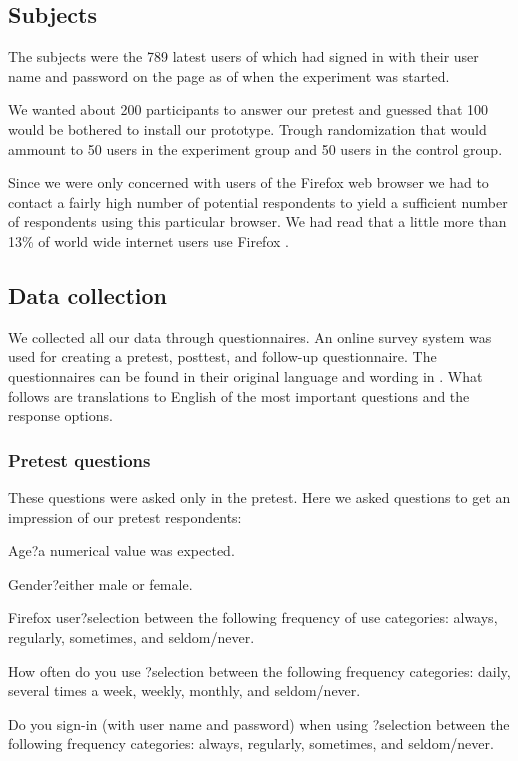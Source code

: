 \subsection{Subjects}

The subjects were the 789 latest users of \urort{} which had
signed in with their user name and password on the \urort{} page as of when
the experiment was started.

We wanted about 200 participants to answer our pretest and guessed that
100 would be bothered to install our prototype. Trough randomization
that would ammount to 50 users in the experiment group and 50 users
in the control group.

Since we were only concerned with users of the Firefox web browser we had to
contact a fairly high number of potential respondents to yield a sufficient
number of respondents using this particular browser. We had read that a little
more than 13\% of world wide internet users use Firefox \citep{onestat08}.

\subsection{Data collection}

We collected all our data through questionnaires. An online survey system was
used for creating a pretest, posttest, and follow-up questionnaire. The
questionnaires can be found in their original language and wording in
. What follows are translations to English
of the most important questions and the response options.

\subsubsection{Pretest questions}

These questions were asked only in the pretest. Here we asked questions to
get an impression of our pretest respondents:

\begin{items}
  \item Age{}?\dash{}a numerical value was expected.
  \item Gender{}?\dash{}either male or female.
  \item Firefox user{}?\dash{}selection between the following frequency of use
    categories: always, regularly, sometimes, and seldom/never.
  \item How often do you use \urort{}?\dash{}selection between the following
    frequency categories: daily, several times a week, weekly, monthly,
    and seldom/never.
  \item Do you sign-in (with user name and password) when using
    \urort{}?\dash{}selection between the following frequency
    categories: always, regularly, sometimes, and seldom/never.
\end{items}

